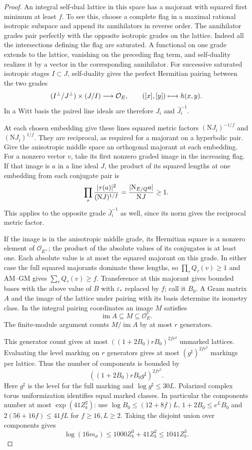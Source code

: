 \begin{proof}
An integral self-dual lattice in this space has a majorant
with squared first minimum at least \(f\). To see this, choose
a complete flag in a maximal rational isotropic subspace
and append its annihilators in reverse order. The annihilator
grades pair perfectly with the opposite isotropic grades
on the lattice. Indeed all the intersections defining the
flag are saturated. A functional on one grade extends to
the lattice, vanishing on the preceding flag term, and
self-duality realizes it by a vector in the corresponding
annihilator.
For successive saturated isotropic stages \(I\subset J\), self-duality gives the perfect Hermitian pairing between the two grades
\[
  (I^\perp/J^\perp)\times(J/I)\longrightarrow{\cal O}_E,\qquad ([x],[y])\longmapsto h(x,y).
\]
 In a Witt basis the paired line ideals are
therefore \(J_i\) and \(\bar J_i^{-1}\).

At each chosen
embedding give these lines squared metric factors
\((\mathrm N J_i)^{-1/f}\) and \((\mathrm N J_i)^{1/f}\).
They are reciprocal, as required for a majorant on a
hyperbolic pair. Give the anisotropic middle space an
orthogonal majorant at each embedding. For a nonzero vector \(v\), take its first nonzero
graded image in the increasing flag. If that image is \(a\)
in a line ideal \(J\), the product of its squared lengths
at one embedding from each conjugate pair is
\[
 \prod_\tau\frac{|\tau(a)|^2}{(\mathrm N J)^{1/f}}
      =\frac{|\mathrm N_{E/Q}a|}{\mathrm N J}\ge1 .
\]
This applies to the opposite grade \(\bar J_i^{-1}\) as well,
since its norm gives the reciprocal metric factor.

If the
image is in the anisotropic middle grade, its Hermitian
square is a nonzero element of \(\mathcal O_{E^+}\); the
product of the absolute values of its conjugates is at
least one. Each absolute value is at most the squared
majorant on this grade. In either case the full squared
majorants dominate these lengths, so
\(\prod_\tau Q_\tau(v)\ge1\) and AM--GM gives
\(\sum_\tau Q_\tau(v)\ge f\).
Transference at this majorant gives bounded bases with the
above value of \(B\) with \(\varepsilon_*\) replaced by \(f\);
call it \(B_0\). A Gram matrix \(A\) and the image of the
lattice under pairing with its basis determine its isometry
class. In the integral pairing coordinates an image \(M\) satisfies
\[
             \operatorname{im} A\subseteq M\subseteq\mathcal O_E^r .
\]
The finite-module argument counts \(M/\operatorname{im}A\)
by at most \(r\) generators.

This generator count gives at most \(((1+2B_0)rB_0)^{2fr^2}\) unmarked lattices. Evaluating the
level marking on \(r\) generators gives at most
\((g^\sharp)^{2fr^2}\) markings per lattice. Thus the number of
components is bounded by
\[
          ((1+2B_0)rB_0 g^\sharp)^{2fr^2}.
\] Here \(g^\sharp\) is the level for the full
marking and \(\log g^\sharp\le30L\).
Polarized complex torus uniformization identifies equal
marked classes. In particular the components number at most
\(\exp(41Z_b^2)\): use
\(\log B_0\le (12+8f)L\), \(1+2B_0\le e^L B_0\) and
\(2(56+16f)\le41fL\) for \(f\ge16, L\ge2\).
Taking the disjoint union over components gives
\[
 \log(16m_\sigma)\le1000Z_b^3+41Z_b^2\le1041Z_b^3.
\]
\label{cor:slice-evaluation-net-5}


\end{proof}
